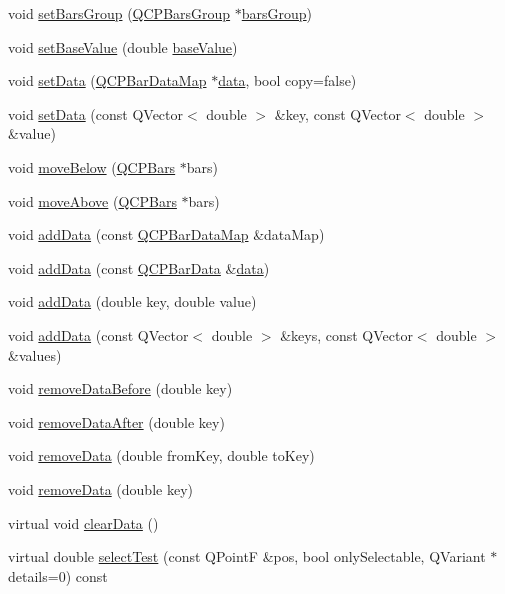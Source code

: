 \begin{DoxyCompactItemize}
void \hyperlink{class_q_c_p_bars_aedd1709061f0b307c47ddb45e172ef9a}{set\+Bars\+Group} (\hyperlink{class_q_c_p_bars_group}{Q\+C\+P\+Bars\+Group} $\ast$\hyperlink{class_q_c_p_bars_a6d6b2b17619a0ba9c7a88bb2b90fc178}{bars\+Group})
\item 
void \hyperlink{class_q_c_p_bars_a574ec7eb7537566df1a28ff085d75623}{set\+Base\+Value} (double \hyperlink{class_q_c_p_bars_a3c8686a74396883fd1da87b2e325b043}{base\+Value})
\item 
void \hyperlink{class_q_c_p_bars_aa3435aab19e0a49e4e7b41bd36a8d96b}{set\+Data} (\hyperlink{qcustomplot_8h_aa846c77472cae93def9f1609d0c57191}{Q\+C\+P\+Bar\+Data\+Map} $\ast$\hyperlink{class_q_c_p_bars_ac05c21de37f677545d06fd852ef8a743}{data}, bool copy=false)
\item 
void \hyperlink{class_q_c_p_bars_a3efded5df4a82ecb201f7c28099fa2e5}{set\+Data} (const Q\+Vector$<$ double $>$ \&key, const Q\+Vector$<$ double $>$ \&value)
\item 
void \hyperlink{class_q_c_p_bars_a69fc371346980f19177c3d1ecdad78ee}{move\+Below} (\hyperlink{class_q_c_p_bars}{Q\+C\+P\+Bars} $\ast$bars)
\item 
void \hyperlink{class_q_c_p_bars_ac22e00a6a41509538c21b04f0a57318c}{move\+Above} (\hyperlink{class_q_c_p_bars}{Q\+C\+P\+Bars} $\ast$bars)
\item 
void \hyperlink{class_q_c_p_bars_a1f29cf08615040993209147fa68de3f2}{add\+Data} (const \hyperlink{qcustomplot_8h_aa846c77472cae93def9f1609d0c57191}{Q\+C\+P\+Bar\+Data\+Map} \&data\+Map)
\item 
void \hyperlink{class_q_c_p_bars_a142158b1addefd53259002dd3ab22c3a}{add\+Data} (const \hyperlink{class_q_c_p_bar_data}{Q\+C\+P\+Bar\+Data} \&\hyperlink{class_q_c_p_bars_ac05c21de37f677545d06fd852ef8a743}{data})
\item 
void \hyperlink{class_q_c_p_bars_a684dd105403a5497fda42f2094fecbb7}{add\+Data} (double key, double value)
\item 
void \hyperlink{class_q_c_p_bars_a3679a0a9decab0fa03f8f4c6e3344d52}{add\+Data} (const Q\+Vector$<$ double $>$ \&keys, const Q\+Vector$<$ double $>$ \&values)
\item 
void \hyperlink{class_q_c_p_bars_a9d12779a3fad4820aad2c428f368298d}{remove\+Data\+Before} (double key)
\item 
void \hyperlink{class_q_c_p_bars_a99de6e7abbbf03fb41fa604c7f08aa8b}{remove\+Data\+After} (double key)
\item 
void \hyperlink{class_q_c_p_bars_a1fe9bcb57d670defea1bb65cadf43765}{remove\+Data} (double from\+Key, double to\+Key)
\item 
void \hyperlink{class_q_c_p_bars_a837cc9848ad3edd40a6130b508493f93}{remove\+Data} (double key)
\item 
virtual void \hyperlink{class_q_c_p_bars_a11dbbd707132f07f862dff13c5789c2b}{clear\+Data} ()
\item 
virtual double \hyperlink{class_q_c_p_bars_a0d37a9feb1d0baf73ce6e809db214445}{select\+Test} (const Q\+Point\+F \&pos, bool only\+Selectable, Q\+Variant $\ast$details=0) const 
\end{DoxyCompactItemize}
